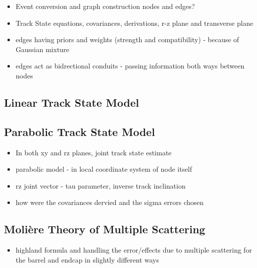 \begin{itemize}
\item Event conversion and graph construction nodes and edges?
\item Track State equations, covariances, derivations, r-z plane and transverse plane
\item edges having priors and weights (strength and compatibility) - because of Gaussian mixture
\item edges act as bidrectional conduits - passing information both ways between nodes
\end{itemize}


\subsection{Linear Track State Model}
\label{linear-state}

\subsection{Parabolic Track State Model}
\label{parabolic-state}


\begin{itemize}
\item In both xy and rz planes, joint track state estimate
\item parabolic model - in local coordinate system of node itself
\item rz joint vector - tau parameter, inverse track inclination
\item how were the covariances dervied and the sigma errors chosen
\end{itemize}

\subsection{Molière Theory of Multiple Scattering}
\begin{itemize}
\item highland formula and handling the error/effects due to multiple scattering for the barrel and endcap in slightly different ways
\end{itemize}





